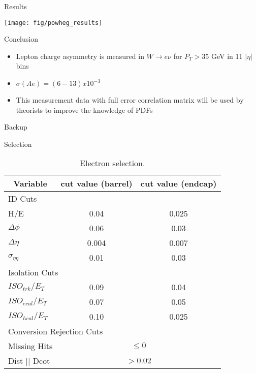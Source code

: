\documentclass[t, 8pt]{beamer}
\begin{document}
\begin{frame}{Results}
  \begin{center}
    \texttt{[image: fig/powheg\_results]}
  \end{center}
\end{frame}

\begin{frame}{Conclusion}

  \begin{itemize}
    \item Lepton charge asymmetry is measured in $W\to e\nu$ for $P_T>35$ GeV in 11 $|\eta|$ bins
    \item $\sigma(Ae) = (6-13) x 10^{-3}$
    \item This measurement data with full error correlation matrix will be used by theorists to
    improve the knowledge of PDFs
  \end{itemize}

\end{frame}


\begin{frame}{Backup}
\end{frame}

\begin{frame}{Selection}
    \begin{table}[htbp]
    \begin{tabular}{|lcc|} \hline
      \multicolumn{1}{|c}{Variable} & \multicolumn{1}{c}{cut value (barrel)}& \multicolumn{1}{c|}{cut value (endcap)}\\
        \hline   \hline
       \multicolumn{3}{|l|}{ID Cuts}\\ \hline
        H/E & 0.04 & 0.025 \\
        $\Delta\phi$ & 0.06 & 0.03 \\
        $\Delta\eta$ & 0.004 & 0.007  \\
        $\sigma_{\eta\eta}$ & 0.01 & 0.03 \\ \hline
      \multicolumn{3}{|l|}{Isolation Cuts}\\ \hline
       $ISO_{trk} / E_T $  & 0.09 & 0.04 \\
       $ISO_{ecal}/ E_T$  & 0.07 & 0.05 \\
       $ISO_{hcal}/ E_T$  & 0.10 & 0.025 \\ \hline
      \multicolumn{3}{|l|}{Conversion Rejection Cuts}\\ \hline
       Missing Hits  & \multicolumn{2}{c|}{$\leq 0$}\\
       Dist $||$ Dcot   & \multicolumn{2}{c|}{$>0.02$}\\
      \hline
    \end{tabular}
    \caption{\label{tab:elecuts} Electron selection.}%
    \end{table}
\end{frame}
\end{document}
